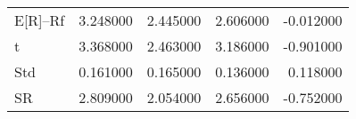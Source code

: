 \begin{tabular}{lrrrr}
\toprule
\midrule
E[R]--Rf & 3.248000 & 2.445000 & 2.606000 & -0.012000 \\
t & 3.368000 & 2.463000 & 3.186000 & -0.901000 \\
Std & 0.161000 & 0.165000 & 0.136000 & 0.118000 \\
SR & 2.809000 & 2.054000 & 2.656000 & -0.752000 \\
\bottomrule
\end{tabular}
